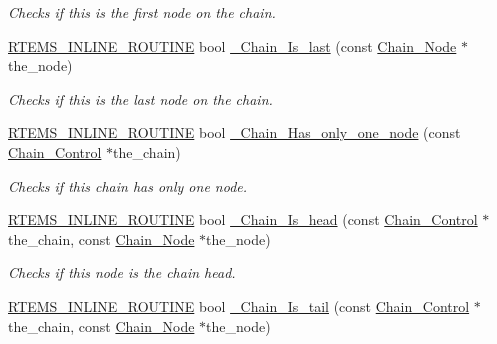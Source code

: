 \begin{DoxyCompactItemize}
\begin{DoxyCompactList}\small\item\em Checks if this is the first node on the chain. \end{DoxyCompactList}\item 
\mbox{\hyperlink{group__RTEMSScoreBaseDefs_gac216239df231d5dbd15e3520b0b9313f}{R\+T\+E\+M\+S\+\_\+\+I\+N\+L\+I\+N\+E\+\_\+\+R\+O\+U\+T\+I\+NE}} bool \mbox{\hyperlink{group__RTEMSScoreChain_ga302e347ec983a8f40a0a36057d817a52}{\+\_\+\+Chain\+\_\+\+Is\+\_\+last}} (const \mbox{\hyperlink{group__RTEMSScoreChain_ga0dd4bfcca1ac7f90de2842e447846d3d}{Chain\+\_\+\+Node}} $\ast$the\+\_\+node)
\begin{DoxyCompactList}\small\item\em Checks if this is the last node on the chain. \end{DoxyCompactList}\item 
\mbox{\hyperlink{group__RTEMSScoreBaseDefs_gac216239df231d5dbd15e3520b0b9313f}{R\+T\+E\+M\+S\+\_\+\+I\+N\+L\+I\+N\+E\+\_\+\+R\+O\+U\+T\+I\+NE}} bool \mbox{\hyperlink{group__RTEMSScoreChain_ga27385f45cfb88979c37a06ba29d5275f}{\+\_\+\+Chain\+\_\+\+Has\+\_\+only\+\_\+one\+\_\+node}} (const \mbox{\hyperlink{unionChain__Control}{Chain\+\_\+\+Control}} $\ast$the\+\_\+chain)
\begin{DoxyCompactList}\small\item\em Checks if this chain has only one node. \end{DoxyCompactList}\item 
\mbox{\hyperlink{group__RTEMSScoreBaseDefs_gac216239df231d5dbd15e3520b0b9313f}{R\+T\+E\+M\+S\+\_\+\+I\+N\+L\+I\+N\+E\+\_\+\+R\+O\+U\+T\+I\+NE}} bool \mbox{\hyperlink{group__RTEMSScoreChain_ga28bb5512888c4dcc88e472e882ca3c3f}{\+\_\+\+Chain\+\_\+\+Is\+\_\+head}} (const \mbox{\hyperlink{unionChain__Control}{Chain\+\_\+\+Control}} $\ast$the\+\_\+chain, const \mbox{\hyperlink{group__RTEMSScoreChain_ga0dd4bfcca1ac7f90de2842e447846d3d}{Chain\+\_\+\+Node}} $\ast$the\+\_\+node)
\begin{DoxyCompactList}\small\item\em Checks if this node is the chain head. \end{DoxyCompactList}\item 
\mbox{\hyperlink{group__RTEMSScoreBaseDefs_gac216239df231d5dbd15e3520b0b9313f}{R\+T\+E\+M\+S\+\_\+\+I\+N\+L\+I\+N\+E\+\_\+\+R\+O\+U\+T\+I\+NE}} bool \mbox{\hyperlink{group__RTEMSScoreChain_gacc6f9947e62bf5bb5fe1cb050b57289b}{\+\_\+\+Chain\+\_\+\+Is\+\_\+tail}} (const \mbox{\hyperlink{unionChain__Control}{Chain\+\_\+\+Control}} $\ast$the\+\_\+chain, const \mbox{\hyperlink{group__RTEMSScoreChain_ga0dd4bfcca1ac7f90de2842e447846d3d}{Chain\+\_\+\+Node}} $\ast$the\+\_\+node)

\end{DoxyCompactItemize}
